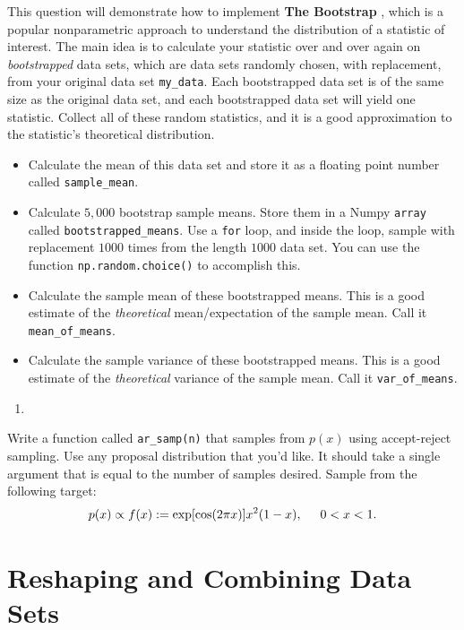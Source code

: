 \documentclass[
  12pt,
  krantz2]{krantz}
\providecommand{\tightlist}{%
  \setlength{\itemsep}{0pt}\setlength{\parskip}{0pt}}
\begin{document}
This question will demonstrate how to implement \textbf{The Bootstrap} \citep{bootstrap}, which is a popular nonparametric approach to understand the distribution of a statistic of interest. The main idea is to calculate your statistic over and over again on \emph{bootstrapped} data sets, which are data sets randomly chosen, with replacement, from your original data set \texttt{my\_data}. Each bootstrapped data set is of the same size as the original data set, and each bootstrapped data set will yield one statistic. Collect all of these random statistics, and it is a good approximation to the statistic's theoretical distribution.

\begin{itemize}
\tightlist
\item
  Calculate the mean of this data set and store it as a floating point number called \texttt{sample\_mean}.
\item
  Calculate \(5,000\) bootstrap sample means. Store them in a Numpy \texttt{array} called \texttt{bootstrapped\_means}. Use a \texttt{for} loop, and inside the loop, sample with replacement \(1000\) times from the length \(1000\) data set. You can use the function \texttt{np.random.choice()} to accomplish this.
\item
  Calculate the sample mean of these bootstrapped means. This is a good estimate of the \emph{theoretical} mean/expectation of the sample mean. Call it \texttt{mean\_of\_means}.
\item
  Calculate the sample variance of these bootstrapped means. This is a good estimate of the \emph{theoretical} variance of the sample mean. Call it \texttt{var\_of\_means}.
\end{itemize}

\begin{enumerate}
\def\labelenumi{\arabic{enumi}.}
\setcounter{enumi}{2}
\tightlist
\item
\end{enumerate}

Write a function called \texttt{ar\_samp(n)} that samples from \(p(x)\) using accept-reject sampling. Use any proposal distribution that you'd like. It should take a single argument that is equal to the number of samples desired. Sample from the following target:
\[
  p(x) \propto f(x) := \exp[\cos(2\pi x)] x^2(1-x), \hspace{5mm} 0 < x < 1.
  \]

\hypertarget{reshaping-and-combining-data-sets}{%
\chapter{Reshaping and Combining Data Sets}\label{reshaping-and-combining-data-sets}}
\end{document}
